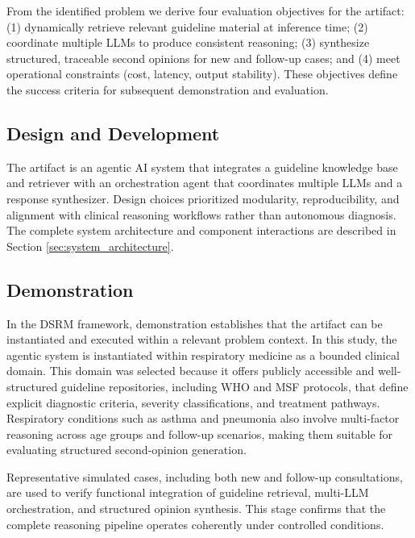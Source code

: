 \documentclass[preprint,12pt]{elsarticle}
\begin{document}
From the identified problem we derive four evaluation objectives for the artifact: (1) dynamically retrieve relevant guideline material at inference time; (2) coordinate multiple LLMs to produce consistent reasoning; (3) synthesize structured, traceable second opinions for new and follow-up cases; and (4) meet operational constraints (cost, latency, output stability). These objectives define the success criteria for subsequent demonstration and evaluation.



\subsection[]{Design and Development}

The artifact is an agentic AI system that integrates a guideline knowledge base and retriever with an orchestration agent that coordinates multiple LLMs and a response synthesizer. Design choices prioritized modularity, reproducibility, and alignment with clinical reasoning workflows rather than autonomous diagnosis. The complete system architecture and component interactions are described in Section \ref{sec:system_architecture}.

\subsection[]{Demonstration}

In the DSRM framework, demonstration establishes that the artifact can be instantiated and executed within a relevant problem context. In this study, the agentic system is instantiated within respiratory medicine as a bounded clinical domain. This domain was selected because it offers publicly accessible and well-structured guideline repositories, including WHO and MSF protocols, that define explicit diagnostic criteria, severity classifications, and treatment pathways. Respiratory conditions such as asthma and pneumonia also involve multi-factor reasoning across age groups and follow-up scenarios, making them suitable for evaluating structured second-opinion generation.

Representative simulated cases, including both new and follow-up consultations, are used to verify functional integration of guideline retrieval, multi-LLM orchestration, and structured opinion synthesis. This stage confirms that the complete reasoning pipeline operates coherently under controlled conditions.
\end{document}

